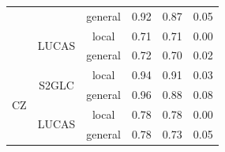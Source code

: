 \begin{table}[H]
\begin{tabular}{c|c|c|p{2.1cm}|p{2.12cm}|p{2cm}}
                        &                        & general & 0.92 & 0.87 & 0.05 \\
                        & \multirow{2}{*}{LUCAS} & local & 0.71 & 0.71 & 0.00 \\
                        &                        & general & 0.72 & 0.70 & 0.02 \\
    \hline
    \multirow{4}{*}{CZ} & \multirow{2}{*}{S2GLC} & local & 0.94 & 0.91 & 0.03 \\
                        &                        & general & 0.96 & 0.88 & 0.08 \\
                        & \multirow{2}{*}{LUCAS} & local & 0.78 & 0.78 & 0.00 \\
                        &                        & general & 0.78 & 0.73 & 0.05 \\
    \end{tabular}
    \end{table}




